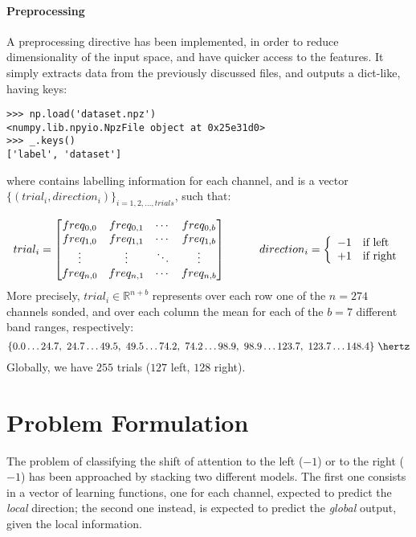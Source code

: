 \documentclass[10pt]{article}
\begin{document}
\paragraph{Preprocessing} A preprocessing directive has been implemented, in order to reduce dimensionality of the input space, and have quicker access to the features. It simply extracts data from the previously discussed files, and outputs a  dict-like, having keys:
\begin{verbatim}
>>> np.load('dataset.npz')
<numpy.lib.npyio.NpzFile object at 0x25e31d0>
>>> _.keys()
['label', 'dataset']
\end{verbatim}
where  contains labelling information for each channel, and  is a vector $\{(trial_i, direction_i)\}_{i= 1, 2, \dots, trials}$, such that:

$$
trial_i  = 
 \begin{bmatrix}
   freq_{0, 0} & freq_{0, 1} & \cdots & freq_{0, b}  \\
   freq_{1, 0} & freq_{1, 1} & \cdots & freq_{1, b}  \\
   \vdots      & \vdots      & \ddots & \vdots       \\
   freq_{n, 0} & freq_{n, 1} & \cdots & freq_{n, b} 
 \end{bmatrix}
\hspace{30pt}
 direction_i = \left\{
 \begin{array}{l l}
   -1 & \text{if left}\\
   +1 & \text{if right}\\
 \end{array}\right .
$$
More precisely, $trial_i \in \mathbb{R} ^{n+b}$ represents over each row one of the $n=274$ channels sonded, and over each column the mean for each of the $b=7$ different band ranges, respectively:
$$
\{0.0 \dots 24.7,\ 24.7 \dots 49.5,\ 49.5 \dots 74.2,\ 74.2 \dots 98.9,\ 98.9 \dots 123.7,\ 123.7 \dots 148.4\} \ \hertz
$$
Globally, we have $255$ trials ($127$ left, $128$ right).


\section{Problem Formulation}
The problem of classifying the shift of attention to
the left ($-1$) or to the right ($-1$) has been
approached by stacking\cite{Wolpert92} two different
models. The first one consists in a vector of
learning functions, one for each channel, expected to
predict the \emph{local} direction; the second one
instead, is expected to predict the \emph{global}
output, given the local information.
\end{document}

